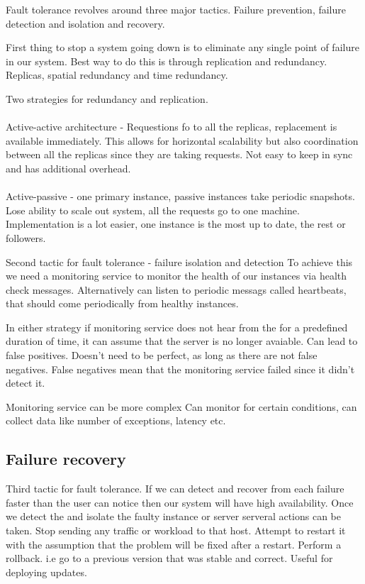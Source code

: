 \documentclass[a4paper, 11pt]{book}
\begin{document}
    Fault tolerance revolves around three major tactics.
    Failure prevention, failure detection and isolation and recovery.

    First thing to stop a system going down is to eliminate any single point of failure in our system.
    Best way to do this is through replication and redundancy.
    Replicas, spatial redundancy and time redundancy.

    Two strategies for redundancy and replication.

    \paragraph{}
    Active-active architecture - Requestions fo to all the replicas, replacement is available immediately.
    This allows for horizontal scalability but also coordination between all the replicas since they are taking requests.
    Not easy to keep in sync and has additional overhead.

    \paragraph{}
    Active-passive - one primary instance, passive instances take periodic snapshots.
    Lose ability to scale out system, all the requests go to one machine.
    Implementation is a lot easier, one instance is the most up to date, the rest or followers.

    Second tactic for fault tolerance - failure isolation and detection
    To achieve this we need a monitoring service to monitor the health of our instances via health check messages.
    Alternatively can listen to periodic messags called heartbeats, that should come periodically from healthy instances.

    In either strategy if monitoring service does not hear from the for a predefined duration of time, it can assume that the server is no longer avaiable.
    Can lead to false positives.
    Doesn't need to be perfect, as long as there are not false negatives.
    False negatives mean that the monitoring service failed since it didn't detect it.

    Monitoring service can be more complex
    Can monitor for certain conditions, can collect data like number of exceptions, latency etc.

    \subsection{Failure recovery}
    Third tactic for fault tolerance.
    If we can detect and recover from each failure faster than the user can notice then our system will have high availability.
    Once we detect the and isolate the faulty instance or server serveral actions can be taken.
    Stop sending any traffic or workload to that host.
    Attempt to restart it with the assumption that the problem will be fixed after a restart.
    Perform a rollback.
    i.e go to a previous version that was stable and correct. Useful for deploying updates.
\end{document}
